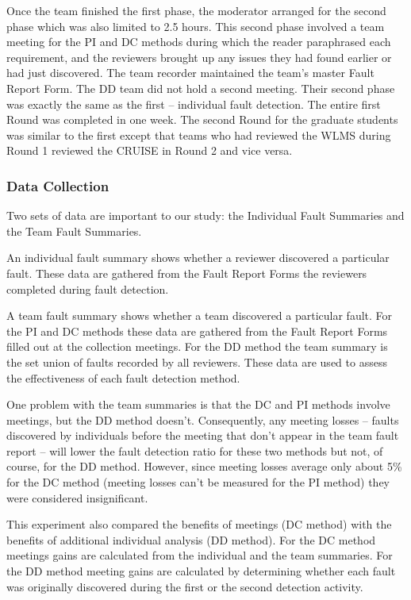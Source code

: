 Once the team finished the first phase, the moderator arranged for the 
second phase which was also limited to 2.5 hours. This second phase
involved a team meeting for the PI and DC methods
during which the reader paraphrased each requirement,
and the reviewers brought up any issues they had found earlier or 
had just discovered. The team  recorder  maintained the team's master 
Fault Report Form. The DD team did not hold a second meeting. Their second 
phase was exactly the same as the first -- individual fault detection.  
The entire first Round was completed in one week. The second Round for 
the graduate students was similar to the first except that teams who 
had reviewed the WLMS during Round 1 reviewed the CRUISE in Round 2 and 
vice versa. 


\subsubsection{Data Collection}
\label{danal}

Two sets of data are important to our study:  
the Individual Fault Summaries and the Team 
Fault Summaries. 

An individual fault summary shows whether a reviewer discovered
a particular fault. These data are gathered from the Fault Report 
Forms the reviewers completed during fault detection.

A team fault summary shows whether a team discovered a particular 
fault. For the PI and DC methods these data are gathered from the Fault Report 
Forms filled out at the collection meetings. For the DD method the team 
summary is the set union of faults recorded by all reviewers. These data
are used to assess the effectiveness of each fault detection method. 


One problem with the team summaries is that the DC and PI methods 
involve meetings, but the DD method doesn't. Consequently, 
any meeting losses -- faults discovered by individuals before 
the meeting that don't appear in the team fault report --
will lower the fault detection ratio for these two methods
but not, of course, for the DD method.  However, 
since meeting losses average only
about 5\% for the DC method (meeting losses can't be measured 
for the PI method) they were considered insignificant.

This experiment also compared the benefits of meetings (DC method)
with the benefits of additional individual analysis (DD method).
For the DC method meetings gains are calculated from the 
individual and the team summaries. For the DD method meeting 
gains are calculated by determining whether each fault was 
originally discovered during the first or the second detection activity.


